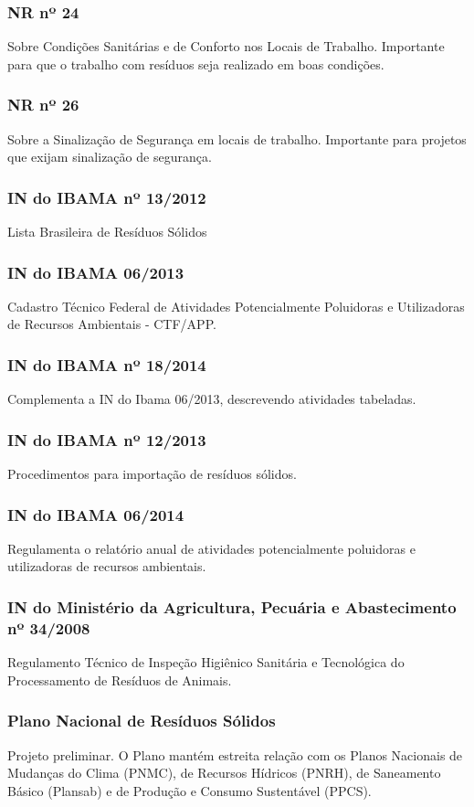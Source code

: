 \begin{subapend}
\begin{subsubapend}
		\subsubsection{NR nº 24}
		Sobre Condições Sanitárias e de Conforto nos Locais de Trabalho. Importante para que o trabalho com resíduos seja realizado em boas condições.
		\subsubsection{NR nº 26}
		Sobre a Sinalização de Segurança em locais de trabalho. Importante para projetos que exijam sinalização de segurança.
		\subsubsection{IN do IBAMA nº 13/2012}
		Lista Brasileira de Resíduos Sólidos
		\subsubsection{IN do IBAMA 06/2013}
		Cadastro Técnico Federal de Atividades Potencialmente Poluidoras e Utilizadoras de Recursos Ambientais - CTF/APP.
		\subsubsection{IN do IBAMA nº 18/2014}
		Complementa a IN do Ibama 06/2013, descrevendo atividades tabeladas.
		\subsubsection{IN do IBAMA nº 12/2013}
		Procedimentos para importação de resíduos sólidos.
		\subsubsection{IN do IBAMA 06/2014}
		Regulamenta o relatório anual de atividades potencialmente poluidoras e utilizadoras de recursos ambientais.
		\subsubsection{IN do Ministério da Agricultura, Pecuária e Abastecimento nº 34/2008}
		Regulamento Técnico de Inspeção Higiênico Sanitária e Tecnológica do Processamento de Resíduos de Animais. 
		\subsubsection{Plano Nacional de Resíduos Sólidos}
		Projeto preliminar. O Plano mantém estreita relação com os Planos Nacionais de Mudanças do Clima (PNMC), de Recursos Hídricos (PNRH), de Saneamento Básico (Plansab) e de Produção e Consumo Sustentável (PPCS).

\end{subsubapend}
\end{subapend}
